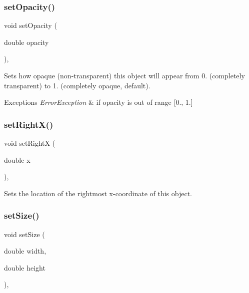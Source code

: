 \subsubsection{\texorpdfstring{set\+Opacity()}{setOpacity()}}
{\footnotesize\ttfamily void set\+Opacity (\begin{DoxyParamCaption}\item[{double}]{opacity }\end{DoxyParamCaption})\hspace{0.3cm}{\ttfamily [virtual]}, {\ttfamily [inherited]}}



Sets how opaque (non-\/transparent) this object will appear from 0. (completely transparent) to 1. (completely opaque, default). 


\begin{DoxyExceptions}{Exceptions}
{\em Error\+Exception} & if opacity is out of range \mbox{[}0., 1.\mbox{]} \\
\hline
\end{DoxyExceptions}
\mbox{\label{classsgl_1_1GObject_a3c90b758cdc2c911c9ef76c4360eb912}} 
\subsubsection{\texorpdfstring{set\+Right\+X()}{setRightX()}}
{\footnotesize\ttfamily void set\+RightX (\begin{DoxyParamCaption}\item[{double}]{x }\end{DoxyParamCaption})\hspace{0.3cm}{\ttfamily [virtual]}, {\ttfamily [inherited]}}



Sets the location of the rightmost x-\/coordinate of this object. 

\mbox{\label{classsgl_1_1GObject_aca25d49481f9bf5fc8f7df4c086c4ce7}} 
\subsubsection{\texorpdfstring{set\+Size()}{setSize()}\hspace{0.1cm}{\footnotesize\ttfamily [1/2]}}
{\footnotesize\ttfamily void set\+Size (\begin{DoxyParamCaption}\item[{double}]{width,  }\item[{double}]{height }\end{DoxyParamCaption})\hspace{0.3cm}{\ttfamily [virtual]}, {\ttfamily [inherited]}}



